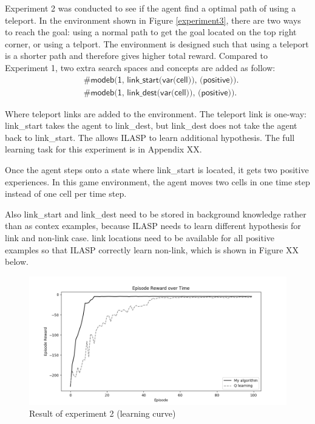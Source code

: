Experiment 2 was conducted to see if the agent find a optimal path of using a teleport. In the environment shown in Figure \ref{experiment3},
there are two ways to reach the goal: using a normal path to get the goal located on the top right corner, or using a telport.
The environment is designed such that using a teleport is a shorter path and therefore gives higher total reward.
Compared to Experiment 1, two extra search spaces and concepts are added as follow:
\begin{equation*}
\begin{split}
&\textsf{\#modeb(1, link\_start(var(cell)), (positive)).}\\
&\textsf{\#modeb(1, link\_dest(var(cell)), (positive)).}
\end{split}
\end{equation*}

Where teleport links are added to the environment. The teleport link is one-way: link\_start takes the agent to link\_dest, but link\_dest does not take the agent back to link\_start.
The allows ILASP to learn additional hypothesis.
The full learning task for this experiment is in Appendix XX.

Once the agent steps onto a state where link\_start is located, it gets two positive experiences.
In this game environment, the agent moves two cells in one time step instead of one cell per time step.

Also link\_start and link\_dest need to be stored in background knowledge rather than as contex examples,
because ILASP needs to learn different hypothesis for link and non-link case.
link locations need to be available for all positive examples so that ILASP correctly learn non-link, which is shown in Figure XX below.

\begin{figure}[!htb]
\centering
\includegraphics[width=1.0\textwidth]{./figures/experiment2_training}
\caption{Result of experiment 2 (learning curve)}
\label{experiment2_training}
\end{figure}

